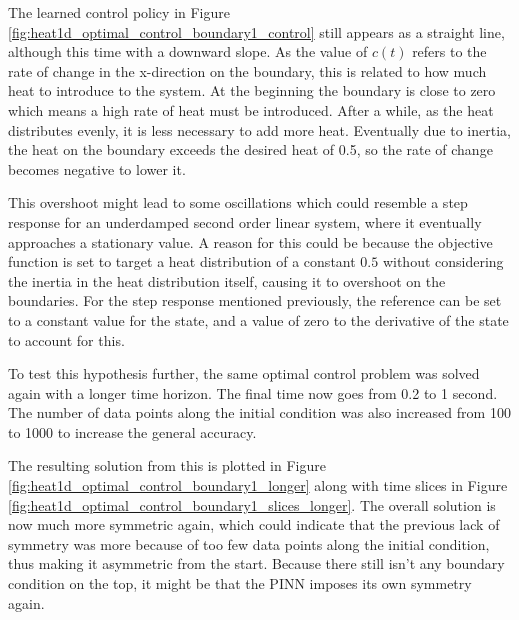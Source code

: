 The learned control policy in Figure \ref{fig:heat1d_optimal_control_boundary1_control} still appears as a straight line, although this time with a downward slope. As the value of $c(t)$ refers to the rate of change in the x-direction on the boundary, this is related to how much heat to introduce to the system. At the beginning the boundary is close to zero which means a high rate of heat must be introduced. After a while, as the heat distributes evenly, it is less necessary to add more heat. Eventually due to inertia, the heat on the boundary exceeds the desired heat of 0.5, so the rate of change becomes negative to lower it.

This overshoot might lead to some oscillations which could resemble a step response for an underdamped second order linear system, where it eventually approaches a stationary value. A reason for this could be because the objective function is set to target a heat distribution of a constant $0.5$ without considering the inertia in the heat distribution itself, causing it to overshoot on the boundaries. For the step response mentioned previously, the reference can be set to a constant value for the state, and a value of zero to the derivative of the state to account for this.

To test this hypothesis further, the same optimal control problem was solved again with a longer time horizon. The final time now goes from 0.2 to 1 second. The number of data points along the initial condition was also increased from 100 to 1000 to increase the general accuracy.

The resulting solution from this is plotted in Figure \ref{fig:heat1d_optimal_control_boundary1_longer} along with time slices in Figure \ref{fig:heat1d_optimal_control_boundary1_slices_longer}. The overall solution is now much more symmetric again, which could indicate that the previous lack of symmetry was more because of too few data points along the initial condition, thus making it asymmetric from the start. Because there still isn't any boundary condition on the top, it might be that the PINN imposes its own symmetry again.


